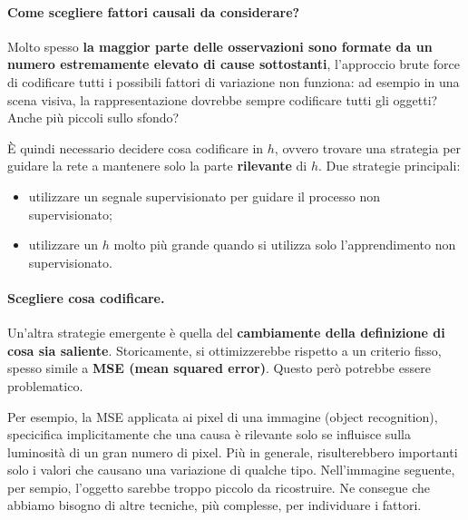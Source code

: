\paragraph{Come scegliere fattori causali da considerare?}
Molto spesso \textbf{la maggior parte delle osservazioni sono formate da un numero estremamente elevato di 
cause sottostanti}, l'approccio brute force di codificare tutti i possibili fattori di variazione non 
funziona: ad esempio in una scena visiva, la rappresentazione dovrebbe sempre codificare tutti gli oggetti?
Anche più piccoli sullo sfondo?


È quindi necessario decidere cosa codificare in $h$, ovvero trovare una strategia per guidare la rete a 
mantenere solo la parte \textbf{rilevante} di $h$.
Due strategie principali:
\begin{itemize}
  \item utilizzare un segnale supervisionato per guidare il processo non supervisionato;
  \item utilizzare un $h$ molto più grande quando si utilizza solo l'apprendimento non supervisionato.
\end{itemize}


\paragraph{Scegliere cosa codificare.}
Un'altra strategie emergente è quella del \textbf{cambiamente della definizione di cosa sia saliente}.
Storicamente, si ottimizzerebbe rispetto a un criterio fisso, spesso simile a \textbf{MSE (mean squared
error)}. Questo però potrebbe essere problematico.


Per esempio, la MSE applicata ai pixel di una immagine (object recognition), specicifica implicitamente 
che una causa è rilevante solo se influisce sulla luminosità di un gran numero di pixel. Più in generale, 
risulterebbero importanti solo i valori che causano una variazione di qualche tipo. 
\newline
\newline
Nell'immagine seguente, per sempio, l'oggetto sarebbe troppo piccolo da ricostruire. Ne consegue che 
abbiamo bisogno di altre tecniche, più complesse, per individuare i fattori.


